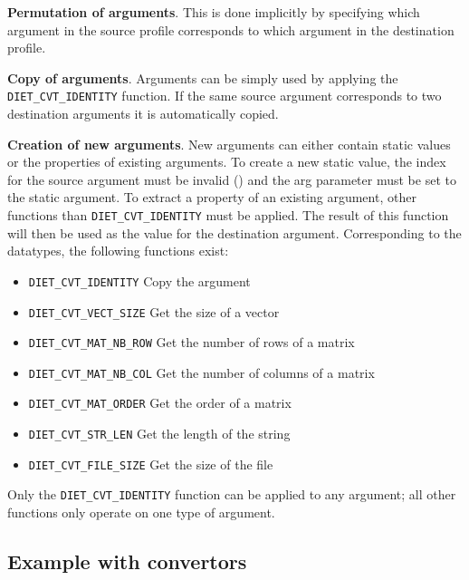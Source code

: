 \begin{description}
\item{\textbf{Permutation of arguments}}. This is done implicitly by specifying
  which argument in the source profile corresponds to which argument in the
  destination profile.
\item{\textbf{Copy of arguments}}. Arguments can be simply used by applying the
  \texttt{DIET\_CVT\_IDENTITY} function. If the same source argument
  corresponds to two destination arguments it is automatically copied.
\item{\textbf{Creation of new arguments}}. New arguments can either contain
  static values or the properties of existing arguments. To create a new static
  value, the index for the source argument must be invalid () and the arg
  parameter must be set to the static argument. To extract a property of an
  existing argument, other functions than \texttt{DIET\_CVT\_IDENTITY} must be
  applied. The result of this function will then be used as the value for the
  destination argument.  Corresponding to the \diet datatypes, the following
  functions exist: \\
\begin{itemize}
\item{\texttt{DIET\_CVT\_IDENTITY}} Copy the argument
\item{\texttt{DIET\_CVT\_VECT\_SIZE}} Get the size of a vector
\item{\texttt{DIET\_CVT\_MAT\_NB\_ROW}} Get the number of rows of a matrix
\item{\texttt{DIET\_CVT\_MAT\_NB\_COL}} Get the number of columns of a matrix
\item{\texttt{DIET\_CVT\_MAT\_ORDER}} Get the order of a matrix
\item{\texttt{DIET\_CVT\_STR\_LEN}} Get the length of the string
\item{\texttt{DIET\_CVT\_FILE\_SIZE}} Get the size of the file
\end{itemize}
Only the \texttt{DIET\_CVT\_IDENTITY} function can be applied to any argument;
all other functions only operate on one type of argument.

\end{description}

\subsection{Example with convertors}

